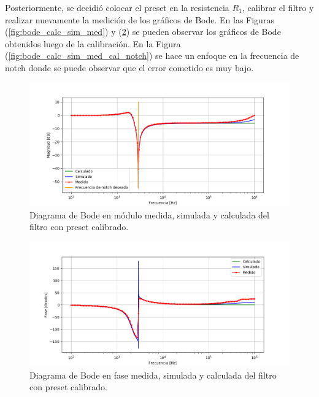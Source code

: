 Posteriormente, se decidió colocar el preset en la resistencia $R_1$, calibrar el filtro y realizar nuevamente la medición de los gráficos de Bode. En las Figuras (\ref{fig:bode_calc_sim_med}) y (\ref{fig:bodefase_calc_sim_med_cal}) se pueden observar los gráficos de Bode obtenidos luego de la calibración. En la Figura (\ref{fig:bode_calc_sim_med_cal_notch}) se hace un enfoque en la frecuencia de notch donde se puede observar que el error cometido es muy bajo.

\begin{figure}[H]
	\centering
	\includegraphics[width=\textwidth]{Imagenes/bode_calc_sim_med_calibrado.PNG}
	\caption{Diagrama de Bode en módulo medida, simulada y calculada del filtro con preset calibrado.}
	\label{fig:bode_calc_sim_med_cal}
\end{figure}

\begin{figure}[H]
	\centering
	\includegraphics[width=\textwidth]{Imagenes/bodefase_calc_sim_med_calibrado.PNG}
	\caption{Diagrama de Bode en fase medida, simulada y calculada del filtro con preset calibrado.}
	\label{fig:bodefase_calc_sim_med_cal}
\end{figure}

